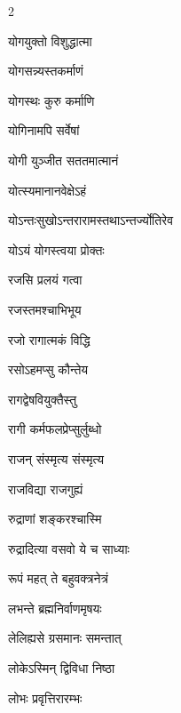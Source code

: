 \begin{multicols}{2}
\begin{indexlist}
\item योगयुक्तो विशुद्धात्मा \dotfill {}
\item योगसन्न्यस्तकर्माणं \dotfill {}
\item योगस्थः कुरु कर्माणि \dotfill {}
\item योगिनामपि सर्वेषां \dotfill {}
\item योगी युञ्जीत सततमात्मानं \dotfill {}
\item योत्स्यमानानवेक्षेऽहं \dotfill {}
\item योऽन्तःसुखोऽन्तरारामस्तथाऽन्तर्ज्योतिरेव \dotfill {}
\item योऽयं योगस्त्वया प्रोक्तः \dotfill {}
\end{indexlist}

\begin{indexlist}
\item रजसि प्रलयं गत्वा \dotfill {}
\item रजस्तमश्चाभिभूय \dotfill {}
\item रजो रागात्मकं विद्धि \dotfill {}
\item रसोऽहमप्सु कौन्तेय \dotfill {}
\item रागद्वेषवियुक्तैस्तु \dotfill {}
\item रागी कर्मफलप्रेप्सुर्लुब्धो \dotfill {}
\item राजन् संस्मृत्य संस्मृत्य \dotfill {}
\item राजविद्या राजगुह्यं \dotfill {}
\item रुद्राणां शङ्करश्चास्मि \dotfill {}
\item रुद्रादित्या वसवो ये च साध्याः \dotfill {}
\item रूपं महत् ते बहुवक्त्रनेत्रं \dotfill {}
\end{indexlist}

\begin{indexlist}
\item लभन्ते ब्रह्मनिर्वाणमृषयः \dotfill {}
\item लेलिह्यसे ग्रसमानः समन्तात् \dotfill {}
\item लोकेऽस्मिन् द्विविधा निष्ठा \dotfill {}
\item लोभः प्रवृत्तिरारम्भः \dotfill {}
\end{indexlist}


\end{multicols}
